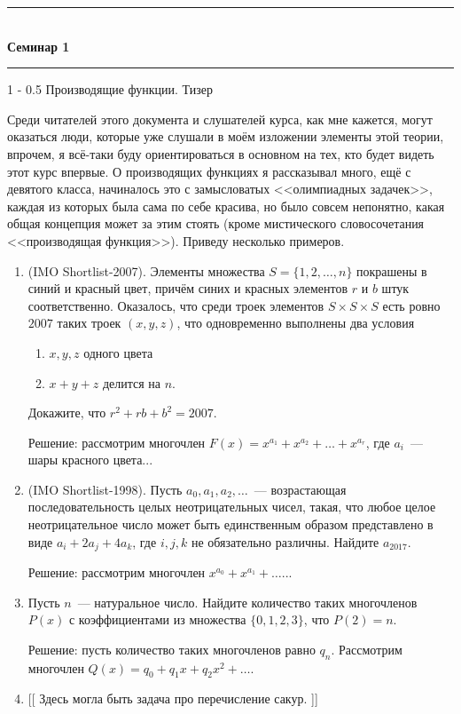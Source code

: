 \documentclass[a5paper]{article}
\makeatletter
\def \topic {Семинар 1}
\theoremstyle{definition}
\renewcommand{\section}{\@startsection
{section}%
{1}%
{\z@}%
{-\baselineskip}%
{0.5\baselineskip}%
{\centering\large\scshape}} %
\makeatother
\begin{document}
\begin{center}

\newcommand{\HRule}{\rule{\linewidth}{0.5mm}}
\HRule \\[0.2cm]
{ \Large \bfseries \topic} %
\HRule

\end{center}

\section{Производящие функции. Тизер}

Среди читателей этого документа и слушателей курса, как мне кажется, могут 
оказаться люди, которые уже слушали в моём изложении элементы этой теории, 
впрочем, я всё-таки буду ориентироваться в основном на тех, кто будет видеть 
этот курс впервые.
О производящих функциях я рассказывал много, ещё с девятого класса, начиналось 
это с замысловатых <<олимпиадных задачек>>, каждая из которых была сама по себе 
красива, но было совсем непонятно, какая общая концепция может за этим стоять 
(кроме мистического словосочетания <<производящая функция>>). Приведу несколько 
примеров.

\begin{enumerate}
	\item (IMO Shortlist-2007). Элементы множества \( S = \{1,2,\ldots, n\} \) 
	покрашены в синий и красный цвет, причём синих и красных элементов \( r \) 
	и \( b \) штук соответственно. Оказалось, что среди троек элементов \( S 
	\times S \times S \) есть ровно \( 2007 \) таких троек \( (x,y,z) \), что 
	одновременно выполнены два условия
	\begin{enumerate}
		\item \( x,y, z \) одного цвета
		\item \( x  + y + z \) делится на \(  n \).
	\end{enumerate}
	Докажите, что \( r^2 + rb + b^2 = 2007 \).
	
	Решение: рассмотрим многочлен \( F(x) = x^{a_1} + x^{a_2} + \ldots + 
	x^{a_r} \), где \( a_i \)~--- шары красного цвета...
	\item (IMO Shortlist-1998). Пусть \( a_0, a_1, a_2, \ldots \)~--- 
	возрастающая последовательность 
	целых неотрицательных чисел, такая, что любое целое неотрицательное число 
	может быть единственным образом представлено в виде \( a_i + 2a_j + 4 a_k 
	\), где \( i,j,k \) не обязательно различны. Найдите \( a_{2017} \).
	
	Решение: рассмотрим многочлен \( x^{a_0} + x^{a_1} + \ldots \)...
	\item Пусть \( n \)~--- натуральное число. Найдите количество таких 
	многочленов \( P(x) \) с коэффициентами из множества \( \{0,1,2,3\} \), что 
	\( P(2) = n \).
	
	Решение: пусть количество таких многочленов равно  \( q_n \). Рассмотрим 
	многочлен \( Q(x) = q_0 + q_1 x + q_2 x^2 + \ldots \).
	\item {}[[ Здесь могла быть задача про перечисление сакур. ]]
\end{enumerate}
\end{document}
